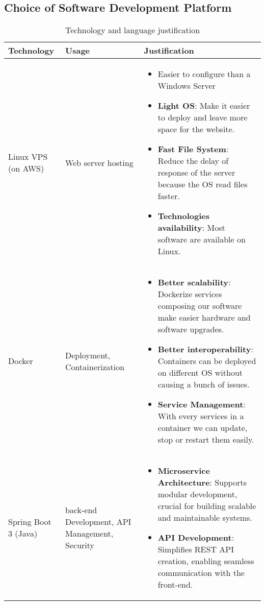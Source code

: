 \documentclass[conference]{IEEEtran}
\begin{document}
\subsection{Choice of Software Development Platform}
\begin{table}[H]
    \centering
    \caption{Technology and language justification}
    \begin{adjustbox}{max width=\textwidth}
    \begin{tabular}{|>{\centering\arraybackslash}m{1.7cm}|>{\centering\arraybackslash}m{1.8 cm}|m{5cm}|}
        \hline
        \textbf{Technology} & \textbf{Usage} & \textbf{Justification} \\
        \hline
        Linux VPS (on AWS) & Web server hosting & 
        \begin{itemize}
            \item Easier to configure than a Windows Server
            \item \textbf{Light OS}: Make it easier to deploy and leave more space for the website.
            \item \textbf{Fast File System}: Reduce the delay of response of the server because the OS read files faster.
            \item \textbf{Technologies availability}: Most software are available on Linux.
        \end{itemize} \\
        \hline
        Docker & Deployment, Containerization  & 
        \begin{itemize}
            \item \textbf{Better scalability}: Dockerize services composing our software make easier hardware and software upgrades.
            \item \textbf{Better interoperability}: Containers can be deployed on different OS without causing a bunch of issues.
            \item \textbf{Service Management}: With every services in a container we can update, stop or restart them easily.
        \end{itemize} \\
        \hline
        Spring Boot 3 (Java) & back-end Development, API Management, Security & 
        \begin{itemize}
            \item \textbf{Microservice Architecture}: Supports modular development, crucial for building scalable and maintainable systems.
            \item \textbf{API Development}: Simplifies REST API creation, enabling seamless communication with the front-end.

\end{itemize}
\end{tabular}
\end{adjustbox}
\end{table}
\end{document}
